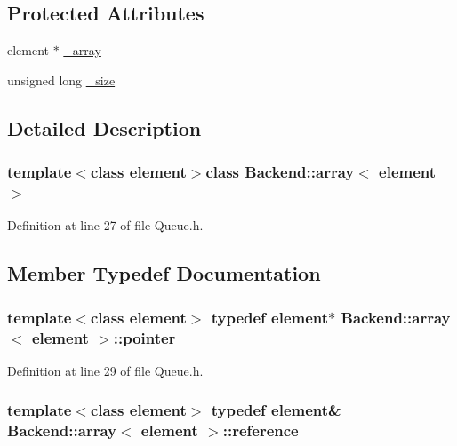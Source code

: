 \subsection*{Protected Attributes}
\begin{DoxyCompactItemize}
\item 
element $\ast$ \hyperlink{class_backend_1_1array_ac588c1e30c2c4748bc9a5bb12b9320af}{\+\_\+array}
\item 
unsigned long \hyperlink{class_backend_1_1array_ae51d64e87b42931946111c28b98e8a18}{\+\_\+size}
\end{DoxyCompactItemize}


\subsection{Detailed Description}
\subsubsection*{template$<$class element$>$class Backend\+::array$<$ element $>$}



Definition at line 27 of file Queue.\+h.



\subsection{Member Typedef Documentation}
\hypertarget{class_backend_1_1array_a6d8785dc8b979153ef122f4e3bad1408}{
\subsubsection[{pointer}]{\setlength{\rightskip}{0pt plus 5cm}template$<$class element$>$ typedef element$\ast$ {\bf Backend\+::array}$<$ element $>$\+::{\bf pointer}}}\label{class_backend_1_1array_a6d8785dc8b979153ef122f4e3bad1408}


Definition at line 29 of file Queue.\+h.

\hypertarget{class_backend_1_1array_aa98075b8d7a4e63ea919ee9d1d4df4a9}{
\subsubsection[{reference}]{\setlength{\rightskip}{0pt plus 5cm}template$<$class element$>$ typedef element\& {\bf Backend\+::array}$<$ element $>$\+::{\bf reference}}}\label{class_backend_1_1array_aa98075b8d7a4e63ea919ee9d1d4df4a9}



